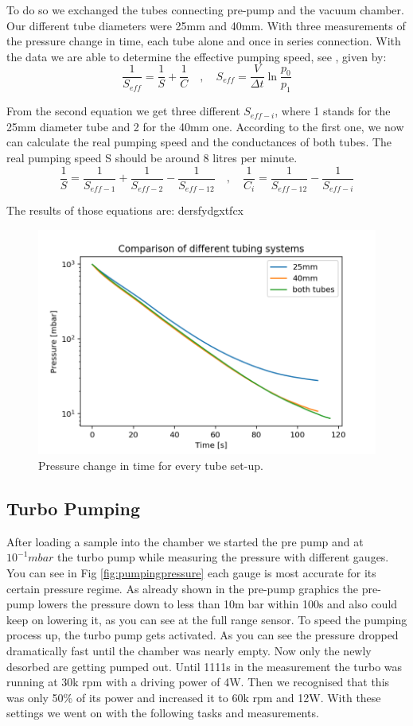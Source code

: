 \documentclass[]{article}
\begin{document}
To do so we exchanged the tubes connecting pre-pump and the vacuum chamber. Our different tube diameters were 25mm and 40mm. With three measurements of the pressure change in time, each tube alone and once in series connection. With the data we are able to determine the effective pumping speed, see \cite[Page 93]{VacuumHandbook}, given by:
\[ \frac{1}{S_{eff}} = \frac{1}{S} + \frac{1}{C} \quad , \quad
S_{eff} = \frac{V}{\Delta t} \ln{ \frac{p_0}{p_1} } \]

From the second equation we get three different $S_{eff-i}$, where 1 stands for the 25mm diameter tube and 2 for the 40mm one. According to the first one, we now can calculate the real pumping speed and the conductances of both tubes. The real pumping speed S should be around 8 litres per minute.
\[ \frac{1}{S} = \frac{1}{S_{eff-1}} + \frac{1}{S_{eff-2}} -\frac{1}{S_{eff-12}} \quad , \quad
\frac{1}{C_i} = \frac{1}{S_{eff-12}} - \frac{1}{S_{eff-i}} \]

The results of those equations are: dersfydgxtfcx

\begin{figure}[!h]
\centering\includegraphics[width=.75\textwidth]{Plots/Comparison.png}
\caption{Pressure change in time for every tube set-up.}
\label{fig::comparison}
\end{figure}


\subsection{Turbo Pumping}
After loading a sample into the chamber we started the pre pump and at $10^{-1}mbar$ the turbo pump while measuring the pressure with different gauges. You can see in Fig \ref{fig:pumpingpressure} each gauge is most accurate for its certain pressure regime.
As already shown in the pre-pump graphics the pre-pump lowers the pressure down to less than 10m bar within 100s and also could keep on lowering it, as you can see at the full range sensor. To speed the pumping process up, the turbo pump gets activated. As you can see the pressure dropped dramatically fast until the chamber was nearly empty. Now only the newly desorbed are getting pumped out. Until 1111s in the measurement the turbo was running at 30k rpm with a driving power of 4W. Then we recognised that this was only 50\% of its power and increased it to 60k rpm and 12W. With these settings we went on with the following tasks and measurements.
\end{document}
